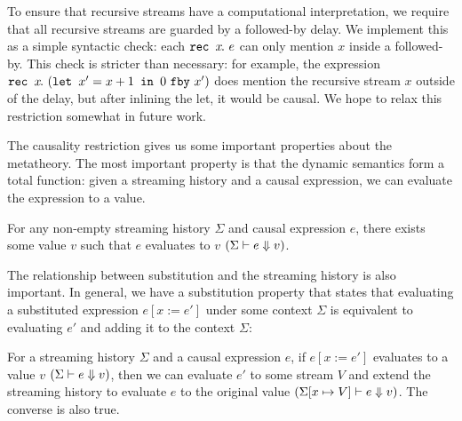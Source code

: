 To ensure that recursive streams have a computational interpretation, we require that all recursive streams are guarded by a followed-by delay.
We implement this as a simple syntactic check: each $\texttt{rec~} x\hspace{-0.1em}.~e$ can only mention $x$ inside a followed-by.
This check is stricter than necessary: for example, the expression $\texttt{rec~} x\hspace{-0.1em}.~(\texttt{let~} x' = x + 1 \texttt{~in~} 0~\texttt{fby}~x')$ does mention the recursive stream $x$ outside of the delay, but after inlining the let, it would be causal.
We hope to relax this restriction somewhat in future work.

The causality restriction gives us some important properties about the metatheory.
The most important property is that the dynamic semantics form a total function: given a streaming history and a causal expression, we can evaluate the expression to a value.


\begin{theorem}
  For any non-empty streaming history $\Sigma$ and causal expression $e$, there exists some value $v$ such that $e$ evaluates to $v$ $(\Sigma \vdash e \Downarrow v)$.
\end{theorem}

The relationship between substitution and the streaming history is also important.
In general, we have a substitution property that states that evaluating a substituted expression $e[x := e']$ under some context $\Sigma$ is equivalent to evaluating $e'$ and adding it to the context $\Sigma$:

\begin{theorem}
  For a streaming history $\Sigma$ and a causal expression $e$, if $e[x := e']$ evaluates to a value $v$ $(\Sigma \vdash e \Downarrow v)$, then we can evaluate $e'$ to some stream $V$ and extend the streaming history to evaluate $e$ to the original value $(\Sigma[x \mapsto V] \vdash e \Downarrow v)$.
  The converse is also true.
\end{theorem}


